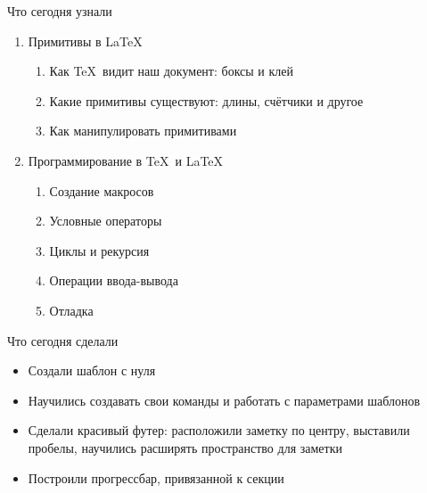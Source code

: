 
\begin{frame}{Что сегодня узнали}\relax
    \begin{enumerate}
        \item Примитивы в \LaTeX
        \begin{enumerate}
            \item Как \TeX\ видит наш документ: боксы и клей
            \item Какие примитивы существуют: длины, счётчики и другое
            \item Как манипулировать примитивами
        \end{enumerate}
        
        \item Программирование в \TeX\ и \LaTeX
        \begin{enumerate}
            \item Создание макросов
            \item Условные операторы
            \item Циклы и рекурсия
            \item Операции ввода-вывода
            \item Отладка
        \end{enumerate}
         
    \end{enumerate}
\end{frame}

\begin{frame}{Что сегодня сделали}\relax
    \begin{itemize}
        \item Создали шаблон с нуля
        \item Научились создавать свои команды и работать с параметрами шаблонов
        \item Сделали красивый футер: расположили заметку по центру, выставили пробелы, научились расширять пространство для заметки
        \item Построили прогрессбар, привязанной к секции
    \end{itemize}
    
\end{frame}
